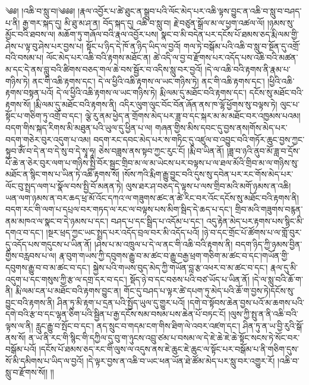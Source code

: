 \setcounter{footnote}{0} 
༄༅། །འཆི་བ་སླུ་བ།༄༅༅། །རྣལ་འབྱོར་པ་ཚེ་ཐུང་ན་སྒྲུབ་པའི་ལོང་མེད་པར་འཆི་ལྟས་བྱུང་ན་འཆི་བ་སླུ་བ་བཤད་པ་ནི། རྒྱ་གར་སྐད་དུ། མི་ཐུ་མ་ཤ་ན། བོད་སྐད་དུ། འཆི་བ་སླུ་བ། རྗེ་བཙུན་སྒྲོལ་མ་ལ་ཕྱག་འཚལ་ལོ། །ཉམས་སུ་མྱོང་བའི་ཐབས་ལ། མཆོག་ཏུ་གཞོལ་བའི་རྣལ་འབྱོར་པས། སྣང་བ་མི་བདེན་པར་དངོས་པོ་ཐམས་ཅད་རྨི་ལམ་གྱི་ཤེས་པ་ལྟ་བུ་ཤེས་པར་བྱས་པ། སྟོང་པ་ཉིད་དེ་ཁོ་ན་ཉིད་ཡིད་ལ་བྱའོ། གལ་ཏེ་བསྒོམ་པའི་འཆི་བ་སླུ་བ་སྔོན་དུ་འགྲོ་བའི་བསམ་པ། ལོང་མེད་པར་འཆི་བའི་རྟགས་མཐོང་ན། ཚེ་འདི་ལ་བྱ་བ་རྫོགས་པར་འདོད་པས་འཆི་བའི་མཚན་མ་དང་དེ་ནས་བླུ་བའི་ཚིགས་བཅད་གལ་ཆེ་བས་སྦྱོར་བ་འདིས་སླུ་བར་བྱའོ། །དེ་ལ་འཆི་བའི་རྟགས་ནི་རྣམ་པ་གཉིས་ཏེ། ནང་གི་འཆི་རྟགས་དང་། དེ་ལ་ཕྱིའི་འཆི་རྟགས་ལ་ཡང་གཉིས་ཏེ། ནང་གི་འཆི་རྟགས་དང་། །ཕྱིའི་འཆི་རྟགས་བསྟན་པའོ། དེ་ལ་ཕྱིའི་འཆི་རྟགས་ལ་ཡང་གཉིས་ཏེ། རྨི་ལམ་དུ་མཐོང་བའི་རྟགས་དང་། དངོས་སུ་མཐོང་བའི་རྟགས་སོ། །རྨི་ལམ་དུ་མཐོང་བའི་རྟགས་ནི། འདིར་ལུག་ལུང་བོང་བོན་ཞོན་ནས་ཁ་ལྷོ་ཕྱོགས་སུ་བལྟས་ཏེ། ལུང་པ་སྟོང་པ་གཅིག་ཏུ་འགྲོ་བ་དང་། ལྕེ་རུ་ནམ་ཕྱེད་ན་གྲོགས་མེད་པར་ཟླ་བ་དང་སྐར་མ་མ་མཐོང་བར་འཁྱམས་པའམ། བདག་གིས་སྐད་རིགས་མི་མཐུན་པའི་ཡུལ་དུ་ཕྱིན་པ་ལ། གཞན་གྱིས་མིས་དབང་དུ་བྱས་ནས།གོས་མེད་པར་བདག་གཅེར་བུར་འདུག་པ་འམ། བདག་རང་དབང་མེད་པར་ས་གཏིང་དུ་འཛུལ་བ་འབྱུང་བའི་གཏོར་ཆུང་བྱས་ཀྱང་སྟུབ་ཨོཾ་བ་དེ་ན་བ་དེ་སུ་བ་དེ་སྭཱ་ཧཱ། ཅེས་བཟླས་ནས་སྟབ་ཀྱང་རུང་ངོ། །རྨི་བ་ཡིན་ནོ། །ཟླ་བ་ཉའི་ནུབ་མོ་ཟླ་བ་དྲོས་པོ་ཆེ་ན་ཅེར་བུར་ལག་པ་གཉིས་སྤྱི་བོར་སྦྱང་གྲིབ་མ་ལ་མ་ཡེངས་པར་བལྟས་པ་ལ་ཐལ་མོའི་གྲིབ་མ་ལ་གཉིས་སུ་མཐོང་ན་སྙིང་གས་པ་ཡིན་ཏེ་འཆི་རྟགས་སོ། །སོས་ཀའི་རྨིག་རྒྱུ་བྱུང་བའི་དུས་སུ་དབེན་པར་རང་གོས་མེད་པར་ལོང་བུ་སྤྲད་ལག་པ་སྣོལ་བས་སྤྱི་བོ་མནན་ཏེ། ལུས་ཐར་ཤ་བཅད་དེ་ལྟས་པ་ལས་གྲིབ་མའི་མགོ་ཉམས་ན་འཆི། ཡན་ལག་ཉམས་ན་བར་ཆད་ཕྲ་མོ་འོང་དཀའ་ལ་གཟུགས་ཚང་ན་ཚེ་རིང་བར་འོང་དངོས་སུ་མཐོང་བའི་རྟགས་ནི། བདག་རང་གི་ལག་པ་དཔྲལ་བར་གཏད་ལ་རང་ལ་བལྟས་པས་མིག་སྦིད་དེ་ཆད་པ་དང་། གྲིབ་མའི་གཟུགས་བརྙན་ནམ་མཁའ་ལ་སྣང་བ་དེ་ཉམས་པ་དང་། བཤད་པ་དང་སྦྲིད་པ་འདོམ་པ་དང་། འདུ་རྟེན་མེད་པར་རྟགས་པས་སྙིང་མི་དགའ་བ་དང་། །སྔར་ཕྲད་ཀྱང་ཡང་སྤྲད་པར་འདོད་བྲལ་བར་མི་འདོད་པའོ། །ཉེ་བ་དང་གྲོང་པོ་ཚོགས་པ་ལ་གློ་བུར་དུ་འདོད་པས་གདུངས་པ་ཡིན་ནོ། །ཤེས་པ་མ་འཁྲུལ་པ་དེ་ལ་ནང་གི་འཆི་བའི་རྟགས་ནི། བདག་ཉིད་ཀྱི་ཉམས་བྱིན་གྱིས་བརླབས་པ་ལ། རྣ་བུག་གཡས་ཀྱི་དབུགས་རྒྱུ་བ་མ་ཚང་བ་རྒྱུ་བརྒྱ་ཕྲག་གཅིག་མ་ཚང་བ་དང་།གཡོན་གྱི་དབུགས་རྒྱུ་བ་བ་མ་ཚང་བ་དང་། སྐྱེས་པའི་གཡས་བུད་མེད་ཀྱི་གཡོན་བླ་རྩ་འཕར་བ་མ་ཚང་བ་དང་། རྣལ་དུ་མི་འདུག་པ་དང་གསུས་ཀྱི་རྩ་ལ་དགྲ་དར་བ་དང་། སྡོད་ཉེ་བ་དང་བཅས་པའི་བཙ་ཡོད་པ་ཡིན་ནོ། །དེ་ལ་སླུ་བའི་ཆོ་ག་ནི། རྨི་ལམ་ངན་པ་མཐོང་བའི་རྟགས་བྱུང་ན། གོང་དུ་བཤད་པ་ལྟར་ཚེ་དཔག་ཏུ་མེད་པའི་ཆོ་ག་བྱས་ཏེ།དངོས་སུ་བྱུང་བའི་རྟགས་ནི། ཤིན་ཏུ་མི་རྟག་པ་དྲན་པའི་སྤྱོད་ཡུལ་དུ་གྱུར་པའོ། །དགེ་བ་སྟོབས་ཆེན་བྱས་པའོ་མ་ཆགས་པའི་དགེ་བའི་རྩ་བ་དང་ལྷན་ཅིག་པའི་སྦྱིན་པ་རྒྱ་དངོས་སམ་བསམ་པས་ཆེན་པོ་བཏང་ངོ། །ལུས་ཀྱི་སྤུ་ན་ནི་འཆི་བའི་ལྟས་ལ་ནི། རླུང་རྒྱུ་བ་སྤོང་བ་དང་། ནད་སྲུང་བ་གདམ་ངག་གིས་ཐིག་ལེ་འབར་འཛག་དང་། ཤིན་ཏུ་ན་ཡ་བྱི་རུའི་སྒོ་ནས་སོ། ན་ཡ་ནི་རང་གི་སྙིང་གི་དཀྱིལ་དུ་བུ་ག་ཉུངས་འབྲུ་ཙམ་པ་བསམ་ལ་དེ་ཇེ་ཆེ་ཇེ་ཆེ་སྟོང་སངས་ཏེ་སོང་བར་བསྒོམ་པའོ། །དངོས་པོ་ཐམས་ཅད་རང་གི་ལུས་ལ་འདུས་ནས་ཇེ་ཆུང་ཇེ་ཆུང་ལ་སྟོང་པར་བསྒོམ་པ་ནི་གཅིག་དུས་སོ་མི་དམིགས་པ་ཡིད་ལ་བྱའོ། །དེ་ལྟར་བྱས་ན་འཆི་བ་ཡང་ཕན་ཡོན་ཐེ་ཚོམ་མེད་པར་སླུ་བར་འགྱུར་རོ། །འཆི་བ་སླུ་བ་རྫོགས་སོ།། །།